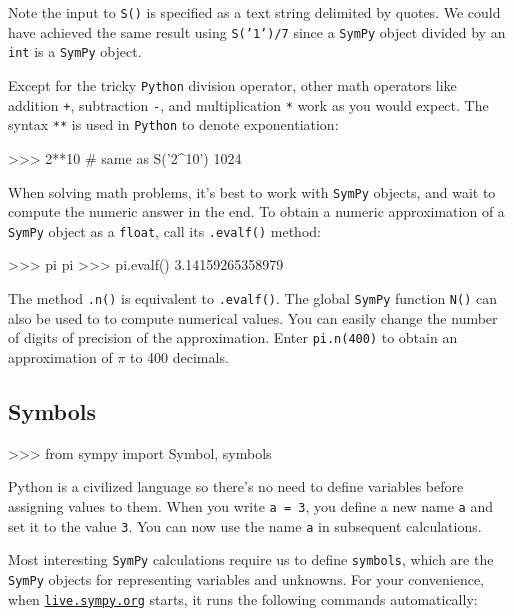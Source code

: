 \noindent
Note the input to \texttt{S()} is specified as a text string delimited by quotes.
We could have achieved the same result using \texttt{S('1')/7} since
a \texttt{SymPy} object divided by an \texttt{int} is a \texttt{SymPy} object.

Except for the tricky \texttt{Python} division operator, 
other math operators like addition \texttt{+}, subtraction \texttt{-}, 
and multiplication \texttt{*} work as you would expect.
The syntax \texttt{**} is used in \texttt{Python} to denote exponentiation:											
\small
\begin{verbatimtab}
>>> 2**10                    # same as S('2^10')
1024
\end{verbatimtab}
\normalsize

\noindent
When solving math problems, 
it's best to work with \texttt{SymPy} objects,
and wait to compute the numeric answer in the end.
To obtain a numeric approximation of a \texttt{SymPy} object as a  \texttt{float}, 
call  its \texttt{.evalf()} method: %

\small
\begin{verbatimtab}
>>> pi
pi
>>> pi.evalf()
3.14159265358979
\end{verbatimtab}
\normalsize

\noindent
The method \texttt{.n()} is equivalent to \texttt{.evalf()}.
The global \texttt{SymPy} function \texttt{N()} can also be used to to compute numerical values.
%
You can easily change the number of digits of precision of the approximation.										
Enter \texttt{pi.n(400)} to obtain an approximation of $\pi$ to 400 decimals.

\subsection{Symbols}
\label{basics:symbols}

\small
\begin{verbatimtab}
>>> from sympy import Symbol, symbols
\end{verbatimtab}
\normalsize

\noindent
Python is a civilized language so there's no need to define variables before assigning values to them.
When you write \texttt{a = 3}, you define a new name \texttt{a} and set it to the value \texttt{3}.
You can now use the name \texttt{a} in  subsequent calculations.

Most interesting \texttt{SymPy} calculations require us to define \texttt{symbols},
which are the \texttt{SymPy} objects for representing variables and unknowns.
For your convenience, when \href{http://live.sympy.org}{\texttt{live.sympy.org}} starts,
it runs the following commands automatically:

